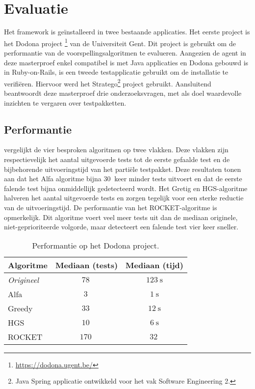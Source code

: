 \section{Evaluatie}
\noindent Het framework is ge\"installeerd in twee bestaande applicaties. Het eerste project is het Dodona project 
\footnote{\url{https://dodona.ugent.be/}} van de Universiteit Gent. Dit project is gebruikt om de performantie van de voorspellingsalgoritmen te evalueren. Aangezien de agent in deze masterproef enkel compatibel is met Java applicaties en Dodona gebouwd is in Ruby-on-Rails, is een tweede testapplicatie gebruikt om de installatie te verifi\"eren. Hiervoor werd het Stratego\footnote{Java Spring applicatie ontwikkeld voor het vak Software Engineering 2.} project gebruikt. Aansluitend beantwoordt deze masterproef drie onderzoeksvragen, met als doel waardevolle inzichten te vergaren over testpakketten.

\subsection{Performantie}
\noindent {} vergelijkt de vier besproken algoritmen op twee vlakken. Deze vlakken zijn respectievelijk het aantal uitgevoerde tests tot de eerste gefaalde test en de bijbehorende uitvoeringstijd van het parti\"ele testpakket. Deze resultaten tonen aan dat het Alfa algoritme bijna $\SI{30}{}$ keer minder tests uitvoert en dat de eerste falende test bijna onmiddellijk gedetecteerd wordt. Het Gretig en HGS-algoritme halveren het aantal uitgevoerde tests en zorgen tegelijk voor een sterke reductie van de uitvoeringstijd. De performantie van het ROCKET-algoritme is opmerkelijk. Dit algoritme voert veel meer tests uit dan de mediaan originele, niet-geprioriteerde volgorde, maar detecteert een falende test vier keer sneller.

\begin{table}[h]
	\centering
	\begin{tabularx}{\columnwidth}{|X||c|c|}
		\hline
		\textbf{Algoritme} & \textbf{Mediaan (tests)} & \textbf{Mediaan (tijd)}\\
		\hline
		\emph{Origineel} & $\SI{78}{}$ & $\SI{123}{\second}$\\
		
		\hline
		
		Alfa & $\SI{3}{}$ & $\SI{1}{\second}$\\
		
		Greedy & $\SI{33}{}$ & $\SI{12}{\second}$\\
		
		HGS & $\SI{10}{}$ & $\SI{6}{\second}$\\
		
		ROCKET & $\SI{170}{}$ & $\SI{32}{}$\\
		
		\hline
	\end{tabularx}
	\caption{Performantie op het Dodona project.}
	\label{tbl:performance-dodona}
\end{table}

